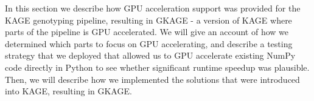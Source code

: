 In this section we describe how GPU acceleration support was provided for the KAGE genotyping pipeline, resulting in GKAGE - a version of KAGE where parts of the pipeline is GPU accelerated.
We will give an account of how we determined which parts to focus on GPU accelerating, and describe a testing strategy that we deployed that allowed us to GPU accelerate existing NumPy code directly in Python to see whether significant runtime speedup was plausible.
Then, we will describe how we implemented the solutions that were introduced into KAGE, resulting in GKAGE.

